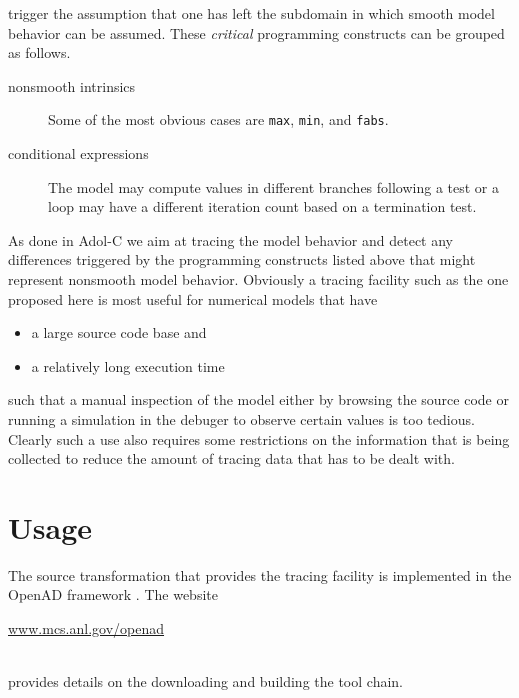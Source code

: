 \documentclass{article}
\newcommand{\code}[1]{{\tt{#1}}}
\begin{document}
trigger the assumption that one has left the subdomain in which smooth model behavior 
can be assumed. 
These {\em critical} programming constructs can be grouped as follows.
\begin{description}
\item[nonsmooth intrinsics] Some of the most obvious cases are \code{max}, \code{min}, and \code{fabs}.
\item[conditional expressions] The model may compute values in different branches following a test 
or a loop may have a different iteration count based on a termination test.
\end{description}
As done in Adol-C we aim at tracing the model behavior and detect any differences triggered 
by the programming constructs listed above that might represent nonsmooth model behavior.
Obviously a tracing facility such as the one proposed here is most useful for 
numerical models that have 
\begin{itemize}
\item a large source code base and 
\item a relatively long execution time
\end{itemize}
such that a manual inspection of the model either by browsing the source code or 
running a simulation in the debuger to observe certain values is too tedious.
Clearly such a use also requires some restrictions on the information that is being 
collected to reduce the amount of tracing data that has to be dealt with.


\section{Usage}

The source transformation that provides the tracing facility is implemented in the 
OpenAD framework \cite{openad}. The website\\ 
\centerline{\url{www.mcs.anl.gov/openad}}\\
provides details on the downloading and building the tool chain. 

\end{document}
